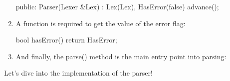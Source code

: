\begin{enumerate}
\begin{cpp}
public:
    Parser(Lexer &Lex) : Lex(Lex), HasError(false) {
        advance();
    }
\end{cpp}

\item
A function is required to get the value of the error flag:

\begin{cpp}
    bool hasError() { return HasError; }
\end{cpp}

\item
And finally, the parse() method is the main entry point into parsing:

\begin{cpp}
    AST *parse();
};

#endif
\end{cpp}

\end{enumerate}


Let’s dive into the implementation of the parser!

